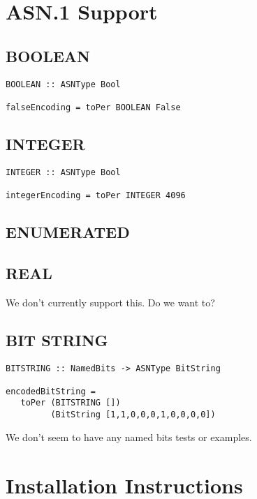 \documentclass{article}
\begin{document}
\section{ASN.1 Support}

\subsection{BOOLEAN}

\lstset{language=Haskell}

\begin{lstlisting}[frame=single]
BOOLEAN :: ASNType Bool

falseEncoding = toPer BOOLEAN False
\end{lstlisting}

\subsection{INTEGER}

\begin{lstlisting}[frame=single]
INTEGER :: ASNType Bool

integerEncoding = toPer INTEGER 4096
\end{lstlisting}

\subsection{ENUMERATED}

\subsection{REAL}

We don't currently support this. Do we want to?

\subsection{BIT STRING}

\begin{lstlisting}[frame=single]
BITSTRING :: NamedBits -> ASNType BitString

encodedBitString = 
   toPer (BITSTRING []) 
         (BitString [1,1,0,0,0,1,0,0,0,0])
\end{lstlisting}

We don't seem to have any named bits tests or examples.

\section{Installation Instructions}
\end{document}
